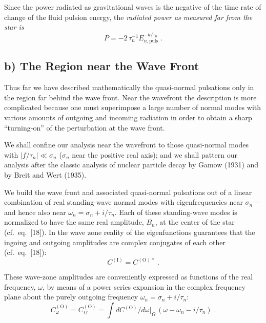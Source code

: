 Since the power radiated as gravitational waves is the negative of the time rate of
change of the fluid pulsion energy, the \emph{radiated power as measured far from the star is}
%
\begin{equation}
  P = -2\,\tau_{n}^{-1} E_{n,\text{puls}}^{-k/\tau_{n}} \;.
  \label{eq:30}
\end{equation}

\subsection*{b) The Region near the Wave Front}

Thus far we have described mathematically the quasi-normal pulsations only in the
region far behind the wave front. Near the wavefront the description is more complicated because one must superimpose a large number of normal modes with various
amounts of outgoing and incoming radiation in order to obtain a sharp ``turning-on'' of
the perturbation at the wave front.

We shall confine our analysis near the wavefront to those quasi-normal modes with
$|f/\tau_{n}| \ll \sigma_{n}$ ($\sigma_{n}$ near the positive real axis); and we shall pattern our analysis after the
classic analysis of nuclear particle decay by Gamow (1931) and by Breit and Wert
(1935).

We build the wave front and associated quasi-normal pulsations out of a linear
combination of real standing-wave normal modes with eigenfrequencies near $\sigma_{n}$---and
hence also near $\omega_{n} = \sigma_{n} + i/\tau_{n}$. Each of these standing-wave modes is normalized to
have the same real amplitude, $B_{n}$, at the center of the star (cf.\ eq.\ [18]). In the wave
zone reality of the eigenfunctions guarantees that the ingoing and outgoing amplitudes
are complex conjugates of each other (cf.\ eq.\ [18]):
%
\begin{equation}
  C^{(\mathrm{I})} = C^{(\mathrm{O})*} \;.
  \label{eq:31}
\end{equation}

These wave-zone amplitudes are conveniently expressed as functions of the real frequency, $\omega$, by means of a power series expansion in the complex frequency plane about
the purely outgoing frequency $\omega_{n} = \sigma_{n} + i/\tau_{n}$:
%
\begin{equation}
  C_{\omega}^{(\mathrm{O})} = C_{\Omega}^{(\mathrm{O})} = \int dC^{(\mathrm{O})}/d\omega\big|_{\Omega}\,(\omega - \omega_{n} - i/\tau_{n}) \;.
  \label{eq:32}
\end{equation}

